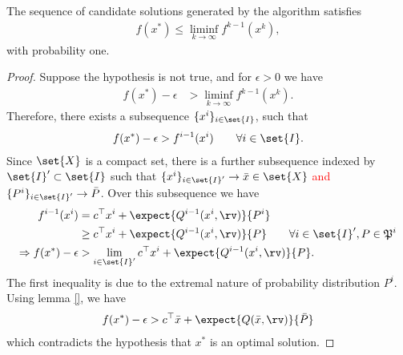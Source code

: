 \documentclass[11pt]{article}
\newcommand{\frakP}{\mathfrak{P}}
\begin{document}
\begin{lemma}
The sequence of candidate solutions generated by the algorithm satisfies
\begin{align*}
    f(x^*) \leq \liminf_{k \rightarrow \infty} f^{k-1}(x^k), 
\end{align*}
with probability one.
\end{lemma}
\begin{proof}
Suppose the hypothesis is not true, and for $\epsilon >0$ we have
\begin{align*}
    f(x^*) - \epsilon &> \liminf_{k \rightarrow \infty} f^{k-1}(x^k).
\end{align*}
Therefore, there exists a subsequence $\{x^i\}_{i \in \set{I}}$, such that
\begin{align}\label{eq:fkn}
    f(x^*) - \epsilon > f^{i-1}(x^i) \qquad \forall i \in \set{I}.
\end{align}
Since $\set{X}$ is a compact set, there is a further subsequence indexed by $\set{I}' \subset \set{I}$ such that $\{x^i\}_{i \in \set{I}'} \rightarrow \bar{x} \in \set{X}$ \textcolor{red}{and $\{P^i\}_{i \in \set{I}'} \rightarrow \bar{P}$}. Over this subsequence we have 
\begin{align*}
	f^{i-1}(x^i) &= c^\top x^i + \expect{Q^{i-1}(x^i,\rv)}{P^i} \\
	& \geq c^\top x^i + \expect{Q^{i-1}(x^i,\rv)}{P} \qquad \forall i \in \set{I}', P \in \frakP^i  \\
	\Rightarrow f(x^*) - \epsilon &> \lim_{i \in \set{I}'} c^\top x^i + \expect{Q^{i-1}(x^i,\rv)}{P}.
\end{align*}
The first inequality is due to the extremal nature of probability distribution $P^i$. Using lemma \ref{}, we have
\begin{align*}
	f(x^*) - \epsilon > c^\top \bar{x} + \expect{Q(\bar{x}, \rv)}{\bar{P}}
\end{align*}
which contradicts the hypothesis that $x^*$ is an optimal solution. 
\end{proof}
\end{document}
